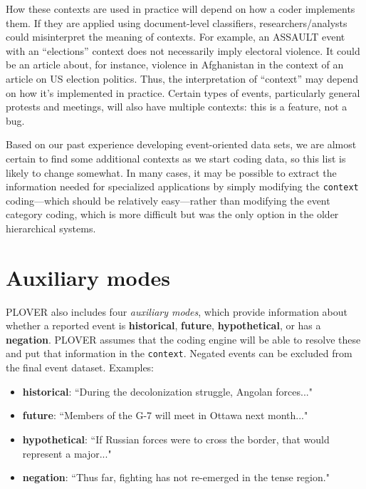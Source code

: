 \documentclass[11pt]{report}
\newcommand{\plcat}[1]{\textsf{#1}}
\newcommand{\plcon}[1]{\textbf{#1}}
\newcommand{\txt}[1]{\texttt{#1}}
\begin{document}
How these contexts are used in practice will depend on how a coder implements them. If they are applied using document-level classifiers, researchers/analysts could misinterpret the meaning of contexts. For example, an \plcat{ASSAULT} event with an ``elections'' context does not necessarily imply electoral violence. It could be an article about, for instance, violence in Afghanistan in the context of an article on US election politics. Thus, the interpretation of ``context'' may depend on how it's implemented in practice. Certain types of events, particularly general protests and meetings, will also have multiple contexts: this is a feature, not a bug.

Based on our past experience developing event-oriented data sets, we are almost certain to find some additional contexts as we start coding data, so this list is likely to change somewhat.  In many cases, it may be possible to extract the information needed for specialized applications by simply modifying the \txt{context} coding---which should be relatively easy---rather than modifying the event category coding, which is more difficult but was the only option in the older hierarchical systems.

\newpage

\section{Auxiliary modes}\label{ssec:special}

PLOVER also includes four \emph{auxiliary modes}, which provide information about whether a reported event is \plcon{historical}, \plcon{future}, \plcon{hypothetical}, or has a \plcon{negation}. PLOVER assumes that the coding engine will be able to resolve these and put that information in the \txt{context}. Negated events can be excluded from the final event dataset. Examples:
   \begin{itemize}
   \item \plcon{historical}: ``During the decolonization struggle, Angolan forces..."
   \item \plcon{future}: ``Members of the G-7 will meet in Ottawa next month..."
   \item \plcon{hypothetical}: ``If Russian forces were to cross the border, that would represent a major..."
   \item \plcon{negation}: ``Thus far, fighting has not re-emerged in the tense region."	
   \end{itemize}
  
\end{document}
